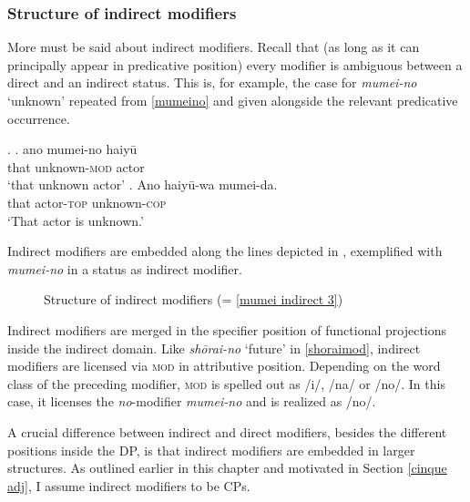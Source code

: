 \subsubsection{Structure of indirect modifiers} \label{indirect mod}

More must be said about indirect modifiers. Recall that (as long as it can principally appear in predicative position) every modifier is ambiguous between a direct and an indirect status. This is, for example, the case for \textit{mumei-no} `unknown’ repeated from \ref{mumeino} and given alongside the relevant predicative occurrence.

\ex. \label{mumei indirect 3} \ag. ano mumei-no haiyū\\
that unknown-\textsc{mod} actor\\
`that unknown actor’
\bg. Ano haiyū-wa mumei-da.\\
that actor-\textsc{top} unknown-\textsc{cop}\\
`That actor is unknown.’

Indirect modifiers are embedded along the lines depicted in , exemplified with \textit{mumei-no} in a status as indirect modifier.

 \begin{figure}
\centering
{}
\caption{Structure of indirect modifiers (= \ref{mumei indirect 3})}
\label{Structure indirect modifiers}
\end{figure}

Indirect modifiers are merged in the specifier position of functional projections inside the indirect domain. Like \textit{shōrai-no} `future’ in \ref{shoraimod}, indirect modifiers are licensed via \textsc{mod} in attributive position. Depending on the word class of the preceding modifier, \textsc{mod} is spelled out as /i/, /na/ or /no/. In this case, it licenses the \textit{no}-modifier \textit{mumei-no} and is realized as /no/.

A crucial difference between indirect and direct modifiers, besides the different positions inside the DP, is that indirect modifiers are embedded in larger structures. As outlined earlier in this chapter and motivated in Section \ref{cinque adj}, I assume indirect modifiers to be CPs.

